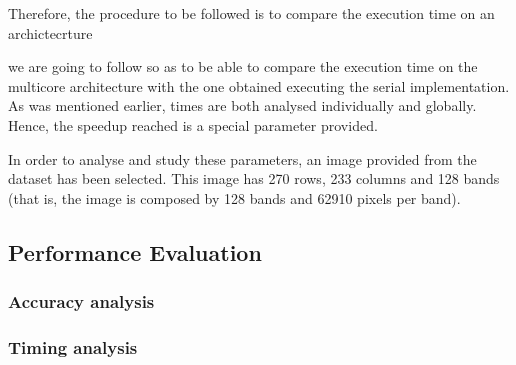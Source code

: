 Therefore, the procedure to be followed is to compare the execution time on an archictecrture


we are going to follow so as to be able to compare the execution time on the multicore architecture with the one obtained executing the serial implementation. As was mentioned earlier, times are both analysed individually and globally. Hence, the speedup reached is a special parameter provided.

In order to analyse and study these parameters, an image provided from the dataset has been selected. This image has 270 rows, 233 columns and 128 bands (that is, the image is composed by 128 bands and 62910 pixels per band).


    \subsection{Performance Evaluation} 
    \subsubsection{Accuracy analysis} 
    \subsubsection{Timing analysis}
   